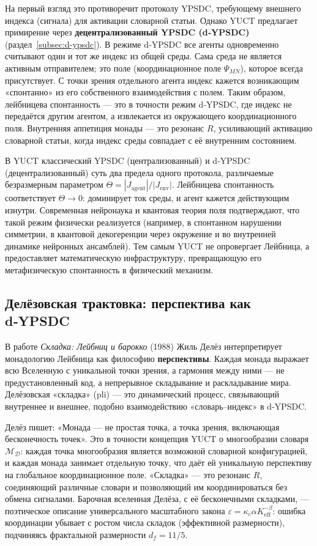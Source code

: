 \documentclass[12pt,a4paper]{article}
\begin{document}
	На первый взгляд это противоречит протоколу YPSDC, требующему внешнего индекса (сигнала) для активации словарной статьи. Однако YUCT предлагает примирение через \textbf{децентрализованный YPSDC (d‑YPSDC)} (раздел~\ref{subsec:d-ypsdc}). В режиме d‑YPSDC все агенты одновременно считывают один и тот же индекс из общей среды. Сама среда не является активным отправителем; это поле (координационное поле \(\Psi_{MN}\)), которое всегда присутствует. С точки зрения отдельного агента индекс кажется возникающим «спонтанно» из его собственного взаимодействия с полем. Таким образом, лейбницева спонтанность — это в точности режим d‑YPSDC, где индекс не передаётся другим агентом, а извлекается из окружающего координационного поля. Внутренняя аппетиция монады — это резонанс \(R\), усиливающий активацию словарной статьи, когда индекс среды совпадает с её внутренним состоянием.
	
	В YUCT классический YPSDC (централизованный) и d‑YPSDC (децентрализованный) суть два предела одного протокола, различаемые безразмерным параметром \(\Theta = |J_{\mathrm{agent}}|/|J_{\mathrm{env}}|\). Лейбницева спонтанность соответствует \(\Theta \to 0\): доминирует ток среды, и агент кажется действующим изнутри. Современная нейронаука и квантовая теория поля подтверждают, что такой режим физически реализуется (например, в спонтанном нарушении симметрии, в квантовой декогеренции через окружение и во внутренней динамике нейронных ансамблей). Тем самым YUCT не опровергает Лейбница, а предоставляет математическую инфраструктуру, превращающую его метафизическую спонтанность в физический механизм.
	
	\subsection{Делёзовская трактовка: перспектива как d‑YPSDC}
	
	В работе \emph{Складка: Лейбниц и барокко} (1988) Жиль Делёз интерпретирует монадологию Лейбница как философию \textbf{перспективы}. Каждая монада выражает всю Вселенную с уникальной точки зрения, а гармония между ними — не предустановленный код, а непрерывное складывание и раскладывание мира. Делёзовская «складка» (pli) — это динамический процесс, связывающий внутреннее и внешнее, подобно взаимодействию «словарь–индекс» в d‑YPSDC.
	
	Делёз пишет: «Монада — не простая точка, а точка зрения, включающая бесконечность точек». Это в точности концепция YUCT о многообразии словаря \(\mathcal{M}_{\mathcal{D}}\): каждая точка многообразия является возможной словарной конфигурацией, и каждая монада занимает отдельную точку, что даёт ей уникальную перспективу на глобальное координационное поле. «Складка» — это резонанс \(R\), соединяющий различные словари и позволяющий им координироваться без обмена сигналами. Барочная вселенная Делёза, с её бесконечными складками, — поэтическое описание универсального масштабного закона \(\varepsilon = \kappa_c \alpha K_{\mathrm{eff}}^{-\beta}\): ошибка координации убывает с ростом числа складок (эффективной размерности), подчиняясь фрактальной размерности \(d_f = 11/5\).
	
\end{document}
